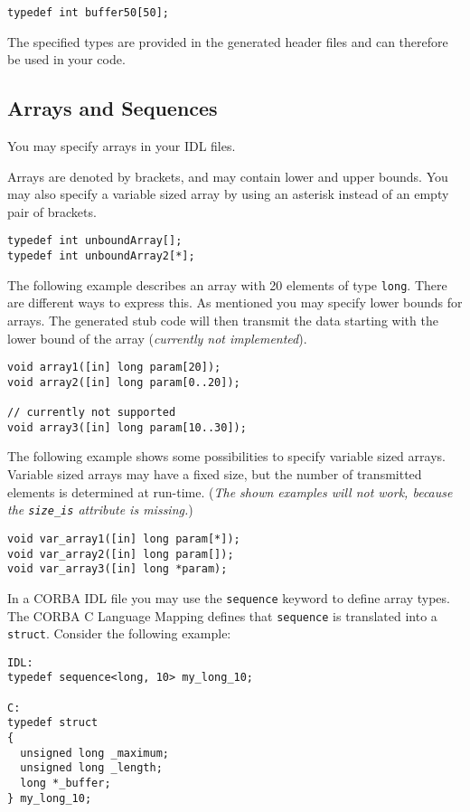 \begin{verbatim}
typedef int buffer50[50];
\end{verbatim}

The specified types are provided in the generated header files and can
therefore be used in your code.

\subsection{Arrays and Sequences}
You may specify arrays in your IDL files.

Arrays are denoted by brackets, and may contain lower and upper bounds.  You
may also specify a variable sized array by using an asterisk instead of an
empty pair of brackets.

\begin{verbatim}
typedef int unboundArray[];
typedef int unboundArray2[*];
\end{verbatim}

The following example describes an array with 20 elements of type \verb|long|.
There are different ways to express this. As mentioned you may specify lower
bounds for arrays. The generated stub code will then transmit the data
starting with the lower bound of the array ({\em currently not implemented}).

\begin{verbatim}
void array1([in] long param[20]);
void array2([in] long param[0..20]);

// currently not supported
void array3([in] long param[10..30]);
\end{verbatim}

The following example shows some possibilities to specify variable
sized arrays. Variable sized arrays may have a fixed size, but the
number of transmitted elements is determined at run-time. ({\em The
shown examples will not work, because the \verb|size_is| attribute
is missing.})

\begin{verbatim}
void var_array1([in] long param[*]);
void var_array2([in] long param[]);
void var_array3([in] long *param);
\end{verbatim}

In a CORBA IDL file you may use the {\tt sequence} keyword to define
array types. The CORBA C Language Mapping defines that {\tt sequence}
is translated into a {\tt struct}. Consider the following example:
\begin{verbatim}
IDL:
typedef sequence<long, 10> my_long_10;

C:
typedef struct
{
  unsigned long _maximum;
  unsigned long _length;
  long *_buffer;
} my_long_10;
\end{verbatim}

